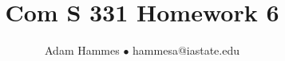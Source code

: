 \documentclass[11pt]{article}
\begin{document}
\title{Com S 331 Homework 6}
\author{Adam Hammes $\bullet$ hammesa@iastate.edu}
\maketitle
\end{document}
